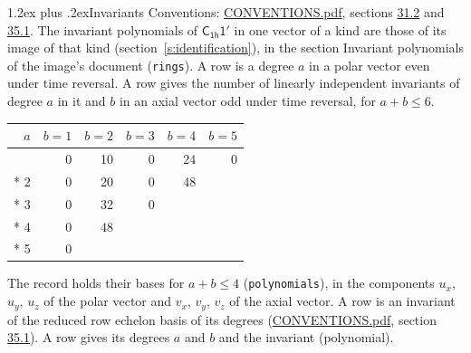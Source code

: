 \documentclass[10pt,a4paper]{article}
\makeatletter
\renewcommand\section{\@startsection{section}{1}{\z@}{-3ex plus -1ex minus -.2ex}%
  {1.2ex plus .2ex}{\normalfont\large\sffamily\bfseries\color{parttitle}}}
\numberwithin{equation}{section}
\newcommand{\grp}[1]{\mathsf{#1}}
\makeatother
\begin{document}
\section{Invariants}\label{s:invariants}
Conventions: \href{../../CONVENTIONS.pdf}{CONVENTIONS.pdf}, sections \href{../../CONVENTIONS.pdf\#conv.31.2}{31.2} and \href{../../CONVENTIONS.pdf\#conv.35.1}{35.1}.
The invariant polynomials of $\grp{C_{1h}1'}$ in one vector of a kind are those of its image of that kind (section~\ref{s:identification}), in the section Invariant polynomials of the image's document (\texttt{rings}).
\leavevmode\label{n:index.degree.polar}\label{n:index.degree.axial}A row is a degree $a$ in a polar vector even under time reversal. A row gives the number of linearly independent invariants of degree $a$ in it and $b$ in an axial vector odd under time reversal, for $a + b \le 6$.
{\small\begin{longtable}{@{}rrrrrr@{}}\toprule
$a$ & $b = 1$ & $b = 2$ & $b = 3$ & $b = 4$ & $b = 5$\\\midrule\endhead
\bottomrule\endfoot\endlastfoot
1 & 0 & 10 & 0 & 24 & 0\\*
2 & 0 & 20 & 0 & 48 & \\*
3 & 0 & 32 & 0 &  & \\*
4 & 0 & 48 &  &  & \\*
5 & 0 &  &  &  & \\
\bottomrule\end{longtable}}
\leavevmode\label{n:local.component.polar}\label{n:local.component.axial}The record holds their bases for $a + b \le 4$ (\texttt{polynomials}), in the components $u_{x}$, $u_{y}$, $u_{z}$ of the polar vector and $v_{x}$, $v_{y}$, $v_{z}$ of the axial vector. \label{n:head.polynomial}A row is an invariant of the reduced row echelon basis of its degrees (\href{../../CONVENTIONS.pdf}{CONVENTIONS.pdf}, section \href{../../CONVENTIONS.pdf\#conv.35.1}{35.1}). A row gives its degrees $a$ and $b$ and the invariant (polynomial).
\end{document}
